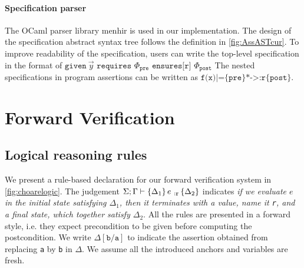 \paragraph{Specification parser} The OCaml parser library menhir is used in our implementation. The design of the specification abstract syntax tree follows the definition in \autoref{fig:AssASTcur}. To improve readability of the specification, users can write the top-level specification in the format of $\texttt{given} \ \vec{y} \texttt{ requires } \Phi_{\texttt{pre}} \texttt{ ensures[r] } \Phi_{\texttt{post}}$
The nested specifications in program assertions can be written as $\texttt{f(x)|=\{pre\}*->:r\{post\}}$. 




\section{Forward Verification}


\subsection{Logical reasoning rules}

We present a rule-based declaration for our forward verification system in \autoref{fig:choarelogic}. 
The judgement $\Sigma;\Gamma \vdash \{\Delta_1\}\,e\ _{:\texttt{\texttt{r}}}\left\{ {\Delta_2}\right\}$ indicates \emph{if we evaluate $e$ in the initial state satisfying $\Delta_1$, then it terminates with a value, name it \texttt{r}, and a final state, which together satisfy $\Delta_2$}. All the rules are presented in a forward style, i.e. they expect precondition to be given before computing the postcondition. We write $\Delta[\mathtt{b/a}]$ to indicate the assertion obtained from replacing \texttt{a} by \texttt{b} in $\Delta$. We assume all the introduced anchors and variables are fresh.

